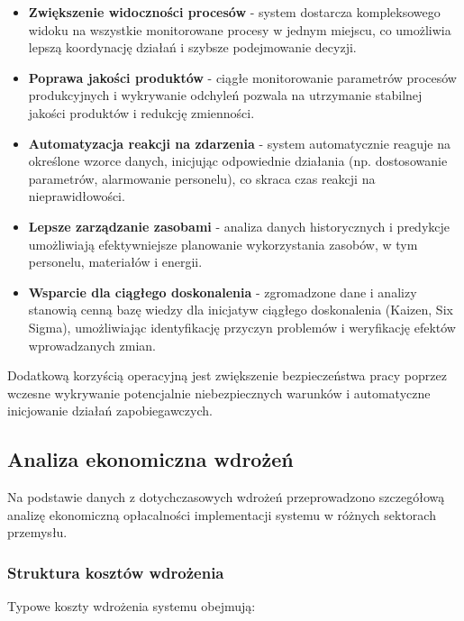 \begin{itemize}
    \item \textbf{Zwiększenie widoczności procesów} - system dostarcza kompleksowego widoku na wszystkie monitorowane procesy w jednym miejscu, co umożliwia lepszą koordynację działań i szybsze podejmowanie decyzji.
    \item \textbf{Poprawa jakości produktów} - ciągłe monitorowanie parametrów procesów produkcyjnych i wykrywanie odchyleń pozwala na utrzymanie stabilnej jakości produktów i redukcję zmienności.
    \item \textbf{Automatyzacja reakcji na zdarzenia} - system automatycznie reaguje na określone wzorce danych, inicjując odpowiednie działania (np. dostosowanie parametrów, alarmowanie personelu), co skraca czas reakcji na nieprawidłowości.
    \item \textbf{Lepsze zarządzanie zasobami} - analiza danych historycznych i predykcje umożliwiają efektywniejsze planowanie wykorzystania zasobów, w tym personelu, materiałów i energii.
    \item \textbf{Wsparcie dla ciągłego doskonalenia} - zgromadzone dane i analizy stanowią cenną bazę wiedzy dla inicjatyw ciągłego doskonalenia (Kaizen, Six Sigma), umożliwiając identyfikację przyczyn problemów i weryfikację efektów wprowadzanych zmian.
\end{itemize}

Dodatkową korzyścią operacyjną jest zwiększenie bezpieczeństwa pracy poprzez wczesne wykrywanie potencjalnie niebezpiecznych warunków i automatyczne inicjowanie działań zapobiegawczych.

\subsection{Analiza ekonomiczna wdrożeń}
\label{subsec:analiza_ekonomiczna}

Na podstawie danych z dotychczasowych wdrożeń przeprowadzono szczegółową analizę ekonomiczną opłacalności implementacji systemu w różnych sektorach przemysłu.

\subsubsection{Struktura kosztów wdrożenia}
\label{subsubsec:struktura_kosztow}

Typowe koszty wdrożenia systemu obejmują:

